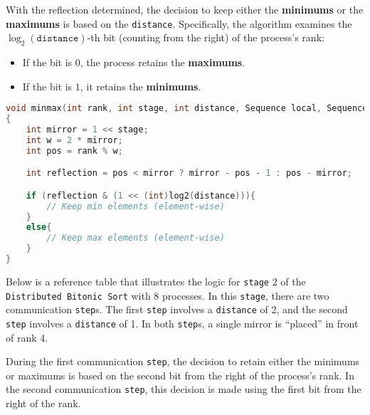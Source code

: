 \documentclass[12pt]{article}
\begin{document}
With the reflection determined, the decision to keep either the \textbf{minimums} or the \textbf{maximums} is based on the \texttt{distance}. Specifically, the algorithm examines the \( \log_2(\texttt{distance}) \)-th bit (counting from the right) of the process's rank:
\begin{itemize}
    \item If the bit is \( 0 \), the process retains the \textbf{maximums}.
    \item If the bit is \( 1 \), it retains the \textbf{minimums}.
\end{itemize}

\vspace{0.3cm}
\begin{lstlisting}[language=C]
void minmax(int rank, int stage, int distance, Sequence local, Sequence remote)
{
    int mirror = 1 << stage;
    int w = 2 * mirror;
    int pos = rank % w;

    int reflection = pos < mirror ? mirror - pos - 1 : pos - mirror;

    if (reflection & (1 << (int)log2(distance))){
        // Keep min elements (element-wise)
    }
    else{
        // Keep max elements (element-wise)
    }
}

\end{lstlisting}
\newpage
Below is a reference table that illustrates the logic for \texttt{stage} 2 of the \texttt{Distributed Bitonic Sort} with 8 processes. In this \texttt{stage}, there are two communication \texttt{step}s. The first \texttt{step} involves a \texttt{distance} of 2, and the second \texttt{step} involves a \texttt{distance} of 1. In both \texttt{step}s, a single mirror is ``placed'' in front of rank 4.

During the first communication \texttt{step}, the decision to retain either the minimums or maximums is based on the second bit from the right of the process's rank. In the second communication \texttt{step}, this decision is made using the first bit from the right of the rank.
\end{document}
